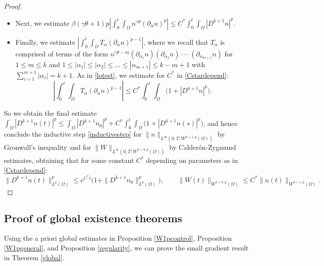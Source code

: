 \documentclass[12pt]{article}
\theoremstyle{plain}
\begin{document}
\begin{proof}
\begin{itemize}
\begin{equation*}
\end{equation*}
\item Next, we estimate $\displaystyle \beta (\gamma \theta + 1) p \left|\int_{0}^{t}  \int_{\Omega} n^{\gamma \theta} (\partial_{\alpha}n)^{p}\right| \le C^{*} \int_{0}^{t} \int_{\Omega} |D^{k + 1}n|^{p}$.
\item Finally, we estimate $\displaystyle \left|\int_{0}^{t} \int_{\Omega} T_{\alpha} (\partial_{\alpha}n)^{p - 1}\right|$, where we recall that $T_{\alpha}$ is comprised of terms of the form $n^{\gamma \theta - m}(\partial_{\alpha_{1}}n)(\partial_{\alpha_{2}}n) \cdot \cdot \cdot (\partial_{\alpha_{m + 1}}n)$ for $1 \le m \le k$ and $1 \le |\alpha_{1}| \le |\alpha_{2}| \le ... \le |\alpha_{m + 1}| \le k - m + 1$ with $\displaystyle \sum_{i = 1}^{m + 1} |\alpha_{i}| = k + 1$. As in \eqref{lotest}, we estimate for $C^{*}$ in \eqref{Cstardepend}:
\begin{equation*}
\left|\int_{0}^{t} \int_{\Omega} T_{\alpha}(\partial_{\alpha}n)^{p - 1}\right| \le C^{*}\int_{0}^{t} \int_{\Omega} \Big(1 + |D^{k + 1}n|^{p}\Big).
\end{equation*}
\end{itemize}

So we obtain the final estimate $\displaystyle 
\int_{\Omega} |D^{k + 1}n(t)|^{p} \le \int_{\Omega} |D^{k + 1}n_{0}|^{p} + C^{*} \int_{0}^{t} \int_{\Omega} \Big(1 + |D^{k + 1}n(s)|^{p}\Big)$, and hence conclude the inductive step \eqref{inductivestep} for $\|n\|_{L^{\infty}(0, T; W^{k + 1, p}(\Omega))}$ by Gronwall's inequality and for $\|W\|_{L^{\infty}(0, T; W^{k + 3, p}(\Omega))}$ by Calder\'{o}n-Zygmund estimates, obtaining that for some constant $C^{*}$ depending on parameters as in \eqref{Cstardepend}:
\begin{equation*}
\|D^{k + 1}n(t)\|_{L^{p}(\Omega)}^{p} \le e^{C^{*}t}\Big(1 + \|D^{k + 1} n_{0}\|_{L^{p}(\Omega)}^{p}\Big), \qquad \|W(t)\|_{W^{k + 3, p}(\Omega)} \le C^{*}\|n(t)\|_{W^{k + 1, p}(\Omega)}.
\end{equation*}

\end{proof}

\subsection{Proof of global existence theorems}\label{globalproofs}

Using the a priori global estimates in Proposition \ref{W1pcontrol}, Proposition \ref{W1pgeneral}, and Proposition \ref{regularity}, we can prove the small gradient result in Theorem \ref{global}. 
\end{document}
